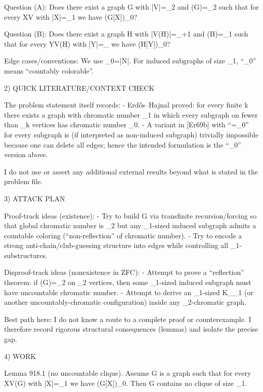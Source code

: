 Question (A): Does there exist a graph G with |V|=\aleph_2 and \chi(G)=\aleph_2 such that for every X\subseteq V with |X|=\aleph_1 we have \chi(G[X])\le \aleph_0?

Question (B): Does there exist a graph H with |V(H)|=\aleph_{\omega+1} and \chi(H)=\aleph_1 such that for every Y\subseteq V(H) with |Y|=\aleph_{\omega} we have \chi(H[Y])\le \aleph_0?

Edge cases/conventions: We use \aleph_0=|\mathbb N|. For induced subgraphs of size \aleph_1, “\chi\le \aleph_0” means “countably colorable”.


2) QUICK LITERATURE/CONTEXT CHECK

The problem statement itself records:
- Erd\H{o}s–Hajnal proved: for every finite k there exists a graph with chromatic number \aleph_1 in which every subgraph on fewer than \aleph_k vertices has chromatic number \le \aleph_0.
- A variant in [Er69b] with “=\aleph_0” for every subgraph is (if interpreted as non-induced subgraph) trivially impossible because one can delete all edges; hence the intended formulation is the “\le\aleph_0” version above.

I do not use or assert any additional external results beyond what is stated in the problem file.


3) ATTACK PLAN

Proof-track ideas (existence):
- Try to build G via transfinite recursion/forcing so that global chromatic number is \aleph_2 but any \aleph_1-sized induced subgraph admits a countable coloring (“non-reflection” of chromatic number).
- Try to encode a strong anti-chain/club-guessing structure into edges while controlling all \aleph_1-substructures.

Disproof-track ideas (nonexistence in ZFC):
- Attempt to prove a “reflection” theorem: if \chi(G)=\aleph_2 on \aleph_2 vertices, then some \aleph_1-sized induced subgraph must have uncountable chromatic number.
- Attempt to derive an \aleph_1-sized K_{\aleph_1} (or another uncountably-chromatic configuration) inside any \aleph_2-chromatic graph.

Best path here: I do not know a route to a complete proof or counterexample. I therefore record rigorous structural consequences (lemmas) and isolate the precise gap.


4) WORK

Lemma 918.1 (no uncountable clique).
Assume G is a graph such that for every X\subseteq V(G) with |X|=\aleph_1 we have \chi(G[X])\le \aleph_0.
Then G contains no clique of size \aleph_1.

